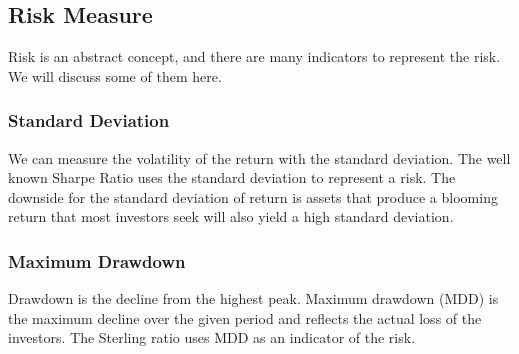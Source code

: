\subsection{Risk Measure}
Risk is an abstract concept, and there are many indicators to represent the risk. We will discuss some of them here. 
\subsubsection{Standard Deviation}
We can measure the volatility of the return with the standard deviation. The well known Sharpe Ratio uses the standard deviation to represent a risk. The downside for the standard deviation of return is assets that produce a blooming return that most investors seek will also yield a high standard deviation.
\subsubsection{Maximum Drawdown}
Drawdown is the decline from the highest peak. Maximum drawdown (MDD) is the maximum decline over the given period and reflects the actual loss of the investors. The Sterling ratio uses MDD as an indicator of the risk. 